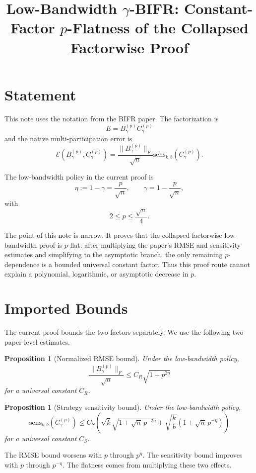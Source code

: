 \documentclass[11pt]{article}
\title{Low-Bandwidth \(\gamma\)-BIFR: Constant-Factor \(p\)-Flatness of the Collapsed Factorwise Proof}
\author{}
\date{}
\newtheorem{proposition}[theorem]{Proposition}
\newcommand{\Eerr}{\mathcal E}
\newcommand{\sens}{\mathrm{sens}}
\begin{document}
\maketitle

\section{Statement}

This note uses the notation from the BIFR paper.
The factorization is
\[
    E = B_\gamma^{(p)}C_\gamma^{(p)}
\]
and the native multi-participation error is
\[
    \Eerr(B_\gamma^{(p)},C_\gamma^{(p)})
    =
    \frac{\|B_\gamma^{(p)}\|_F}{\sqrt n}
    \sens_{k,b}(C_\gamma^{(p)}).
\]

The low-bandwidth policy in the current proof is
\[
    \eta := 1-\gamma = \frac{p}{\sqrt n},
    \qquad
    \gamma = 1-\frac{p}{\sqrt n},
\]
with
\[
    2\le p\le \frac{\sqrt n}{4}.
\]

The point of this note is narrow.
It proves that the collapsed factorwise low-bandwidth proof is \(p\)-flat: after multiplying the paper's RMSE and sensitivity estimates and simplifying to the asymptotic branch, the only remaining \(p\)-dependence is a bounded universal constant factor.
Thus this proof route cannot explain a polynomial, logarithmic, or asymptotic decrease in \(p\).

\section{Imported Bounds}

The current proof bounds the two factors separately.
We use the following two paper-level estimates.

\begin{proposition}[Normalized RMSE bound]
Under the low-bandwidth policy,
\[
    \frac{\|B_\gamma^{(p)}\|_F}{\sqrt n}
    \le
    C_R\sqrt{1+p^{2\eta}}
\]
for a universal constant \(C_R\).
\end{proposition}

\begin{proposition}[Strategy sensitivity bound]
Under the low-bandwidth policy,
\[
    \sens_{k,b}(C_\gamma^{(p)})
    \le
    C_S
    \left(
        \sqrt{k}\sqrt{1+\sqrt n\,p^{-2\eta}}
        +
        \sqrt{\frac{k}{b}}
        \left(1+\sqrt n\,p^{-\eta}\right)
    \right)
\]
for a universal constant \(C_S\).
\end{proposition}

The RMSE bound worsens with \(p\) through \(p^\eta\).
The sensitivity bound improves with \(p\) through \(p^{-\eta}\).
The flatness comes from multiplying these two effects.
\end{document}
